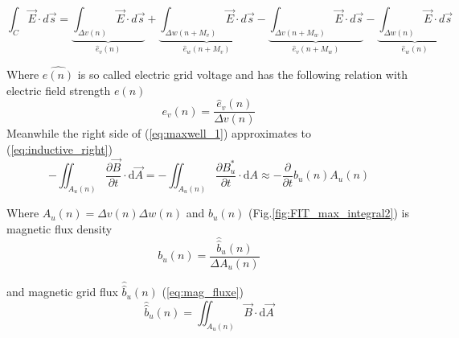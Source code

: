 \begin{equation}
\int_{C}\vec{E}\cdot d\vec{s}
=\underbrace{\int_{\Delta v(n)}\vec{E}\cdot d\vec{s}}_{\widehat{e}_{v}(n)}
+\underbrace{\int_{\Delta w(n+M_{v})}\vec{E}\cdot d\vec{s}}_{\widehat{e}_{w}(n+M_{v})}
-\underbrace{\int_{\Delta v(n+M_{w})}\vec{E}\cdot d\vec{s}}_{\widehat{e}_{v}(n+M_{w})}
-\underbrace{\int_{\Delta w(n)}\vec{E}\cdot d\vec{s}}_{\widehat{e}_{w}(n)}
\label{eq:inductive_left}
\end{equation}

Where $\widehat{e(n)}$ is so called  electric grid voltage and has the following relation with electric field strength $e(n)$
\begin{equation}
 e_{v}(n)=\frac{\widehat{e}_{v}(n)}{\Delta v(n)}
\label{eq:e_field}
\end{equation}
Meanwhile the right side of (\ref{eq:maxwell_1}) approximates to (\ref{eq:inductive_right})
\begin{equation}
-\iint_{A_{u}(n)}\frac{\partial\vec{B}}{\partial t}\cdot\mathrm{d}\vec{A} 
=-\iint_{A_{u}(n)}\frac{\partial B^{*}_{u}}{\partial t}\cdot\mathrm{d}A
\approx -\frac{\partial}{\partial t}b_{u}(n)A_{u}(n)
\label{eq:inductive_right}
\end{equation}

Where $A_{u}(n)=\Delta v(n)\Delta w(n)$ and $b_{u}(n)$ (Fig.\ref{fig:FIT_max_integral2}) is magnetic flux density
\begin{equation}
 b_{u}(n)=\frac{\widehat{\widehat{b}}_{u}(n)}{\Delta A_{u}(n)}
\label{eq:b_flux_density}
\end{equation}

 and magnetic grid flux $\widehat{\widehat{b}}_{u}(n)$ (\ref{eq:mag_fluxe})
\begin{equation}
\widehat{\widehat{b}}_{u}(n)=\iint_{A_{u}(n)}\vec{B}\cdot\mathrm{d}\vec{A}
\label{eq:mag_fluxe}
\end{equation}

